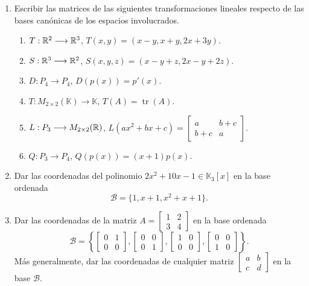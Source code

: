\begin{enumerate}[topsep=6pt, itemsep=.4cm]


\item \label{lineales1-bases} Escribir las matrices de las siguientes transformaciones lineales respecto de las bases canónicas de los espacios involucrados.

\begin{enumerate}
    \item\label{lineales1-bases-a} $T:\mathbb R^2 \longrightarrow \mathbb R^3$, $T(x,y)=(x-y,x+y,2x+3y)$.
    \item\label{lineales1-bases-b} $S:\mathbb R^3 \longrightarrow \mathbb R^2$, $S(x,y,z)=(x-y+z,2x-y+2z)$.
    \item\label{lineales1-base-c} $D:P_4  \longrightarrow P_4$, $D(p(x))=p'(x)$.
    \item $T:M_{2\times 2}(\mathbb{K}) \longrightarrow \mathbb{K}$, $T(A)=\operatorname{tr}(A)$.
    \item\label{lineales1-base-d} $L:P_3 \longrightarrow M_{2\times 2}(\mathbb R)$, $L(ax^2+bx+c)=\begin{bmatrix} a & b+c \\ b+c & a \end{bmatrix}$.
    \item\label{lineales1-base-e} $Q:P_3 \longrightarrow P_4$, $Q(p(x))=(x+1)p(x)$.
\end{enumerate}

\item Dar las coordenadas del polinomio $2x^2+10x-1\in\mathbb{K}_3[x]$ en la base ordenada $$\mathcal{B}=\{1,x+1,x^2+x+1\}.$$

\item Dar las coordenadas de la matriz 
$A=\begin{bmatrix}
    1&2\\3&4 
    \end{bmatrix}
$ en la base ordenada 
$$
\mathcal{B}=\left\{
\begin{bmatrix}
    0&1\\0&0 
    \end{bmatrix},
\begin{bmatrix}
    0&0\\0&1 
    \end{bmatrix},
    \begin{bmatrix}
    1&0\\0&0 
    \end{bmatrix},
    \begin{bmatrix}
    0&0\\1&0 
    \end{bmatrix}
\right\}.
$$
Más generalmente, dar las coordenadas de cualquier matriz $\begin{bmatrix}
    a&b\\c&d 
    \end{bmatrix}$ en la base $\mathcal{B}$.



\end{enumerate}

